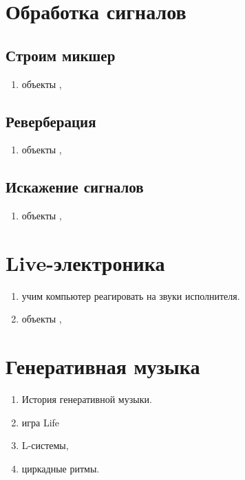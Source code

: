 \documentclass[12pt]{article}
\begin{document}
\section{Обработка сигналов}
\subsection{Строим микшер}
\begin{enumerate}
	\item объекты , 
\end{enumerate}

\subsection{Реверберация}
\begin{enumerate}
	\item объекты , 
\end{enumerate}


\subsection{Искажение сигналов}
\begin{enumerate}
	\item объекты , 
\end{enumerate}

\section{Live-электроника}
\begin{enumerate}
	\item учим компьютер реагировать на звуки исполнителя.
	\item объекты , 
\end{enumerate}

\section{Генеративная музыка}
\begin{enumerate}
	\item История генеративной музыки.
	\item игра Life
	\item L-системы, 
	\item циркадные ритмы.
\end{enumerate}
\end{document}
